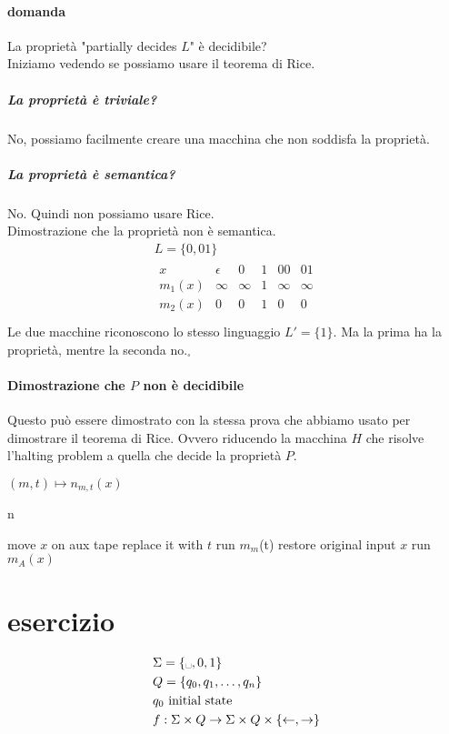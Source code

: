 \documentclass{article}
\begin{document}
\paragraph{domanda} La proprietà "partially decides $L$" è decidibile? \\
Iniziamo vedendo se possiamo usare il teorema di Rice.
\subparagraph{La proprietà è triviale?} No, possiamo facilmente creare una macchina che non soddisfa la proprietà.
\subparagraph{La proprietà è semantica?} No. Quindi non possiamo usare Rice. \\
Dimostrazione che la proprietà non è semantica.
\begin{gather*}
    L = \{0, 01\} \\
    \begin{array}{c|ccccc}
        x & \epsilon & 0 & 1 & 00 & 01 \\
        \hline
        m_1(x) & \infty & \infty & 1 & \infty & \infty \\
        m_2(x) & 0 & 0 & 1 & 0 & 0 \\
    \end{array}
\end{gather*}
Le due macchine riconoscono lo stesso linguaggio $L'=\{1\}$. Ma la prima ha la proprietà, mentre la seconda no.$_\square$

\paragraph{Dimostrazione che $P$ non è decidibile}
Questo può essere dimostrato con la stessa prova che abbiamo usato per dimostrare il teorema di Rice. Ovvero riducendo la macchina $H$ che risolve l'halting problem a quella che decide la proprietà $P$.

$(m,t)\mapsto n_{m,t}(x)$
\begin{algorithm}
    \caption{n}
    move $x$ on aux tape\;
    replace it with $t$\;
    run $m_m$(t)\;
    restore original input $x$\;
    run $m_A(x)$
\end{algorithm}

\section*{esercizio}
\begin{align*}
    & \Sigma = \{\text{\textvisiblespace},0,1\} \\
    & Q = \{q_0, q_1, \dots, q_n\} \\
    & q_0\ \text{initial state} \\
    & f: \Sigma\times Q \to \Sigma\times Q\times \{\leftarrow,\rightarrow\}
\end{align*}
\end{document}
